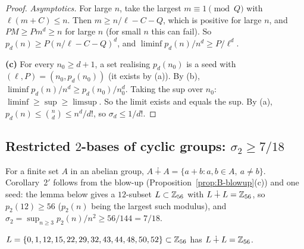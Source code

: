 \begin{proof}
\emph{Asymptotics.} For large $n$, take the largest $m \equiv 1 \pmod{Q}$ with
$\ell(m + C) \le n$. Then $m \ge n/\ell - C - Q$, which is positive for large $n$, and
$PM \ge P m^d \ge n$ for large $n$ (for small $n$ this can fail). So
$p_d(n) \ge P(n/\ell - C - Q)^d$, and $\liminf p_d(n)/n^d \ge P/\ell^d$.

\medskip
\textbf{(c)} For every $n_0 \ge d+1$, a set realising $p_d(n_0)$ is a seed with
$(\ell, P) = (n_0, p_d(n_0))$ (it exists by (a)). By (b),
$\liminf p_d(n)/n^d \ge p_d(n_0)/n_0^d$. Taking the sup over $n_0$:
$\liminf \ge \sup \ge \limsup$. So the limit exists and equals the sup. By (a),
$p_d(n) \le \binom{n}{d} \le n^d/d!$, so $\sigma_d \le 1/d!$.
\end{proof}

\subsection{\texorpdfstring{Restricted $2$-bases of cyclic groups: $\sigma_2 \ge 7/18$}{Restricted 2-bases of cyclic groups: sigma\_2 >= 7/18}}\label{sec:B-sigma2}

For a finite set $A$ in an abelian group, $A \dotplus A = \{a + b : a, b \in A,\ a \ne b\}$. Corollary~2$'$
follows from the blow-up (Proposition~\ref{prop:B-blowup}(c)) and one seed: the lemma below gives a
$12$-subset $L \subset \mathbb{Z}_{56}$ with $L \dotplus L = \mathbb{Z}_{56}$, so $p_2(12) \ge 56$ ($p_2(n)$ being the largest such modulus),
and $\sigma_2 = \sup_{n \ge 3} p_2(n)/n^2 \ge 56/144 = 7/18$.

\begin{lemma}\label{lem:B-seed}
$L = \{0, 1, 12, 15, 22, 29, 32, 43, 44, 48, 50, 52\} \subset \mathbb{Z}_{56}$ has $L \dotplus L = \mathbb{Z}_{56}$.
\end{lemma}

